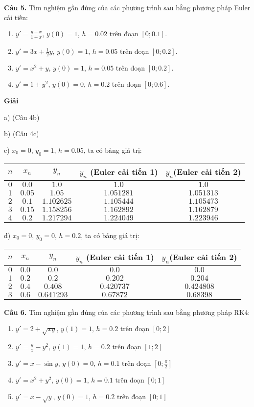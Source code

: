 \textbf{Câu 5.} Tìm nghiệm gần đúng của các phương trình sau bằng phương pháp Euler cải tiến:
\begin{enumerate}[label=\alph*)]
	\item $y'=\frac{y-x}{1+x}$, $y(0)=1$, $h=0.02$ trên đoạn $[0;0.1]$.
	\item $y'=3x+\frac12y$, $y(0)=1$, $h=0.05$ trên đoạn $[0;0.2]$.
	\item $y'=x^2+y$, $y(0)=1$, $h=0.05$ trên đoạn $[0;0.2]$.
	\item $y'=1+y^2$, $y(0)=0$, $h=0.2$ trên đoạn $[0;0.6]$.
\end{enumerate}

\textbf{Giải}\par
a) (Câu 4b)\par
b) (Câu 4c)\par
c) $x_0=0$, $y_0=1$, $h=0.05$, ta có bảng giá trị:
\begin{longtable}{|c|c|c|c|c|}\hline
	$n$ & $x_n$ & $y_n$ & $y_n$ (Euler cải tiến 1) & $y_n$(Euler cải tiến 2) \\ \hline
	$0$ & $0.0$ & $1.0$ & $1.0$ & $1.0$ \\ \hline
	$1$ & $0.05$ & $1.05$ & $1.051281$ & $1.051313$ \\ \hline
	$2$ & $0.1$ & $1.102625$ & $1.105444$ & $1.105473$ \\ \hline
	$3$ & $0.15$ & $1.158256$ & $1.162892$ & $1.162879$ \\ \hline
	$4$ & $0.2$ & $1.217294$ & $1.224049$ & $1.223946$ \\ \hline
\end{longtable}

d) $x_0=0$, $y_0=0$, $h=0.2$, ta có bảng giá trị:
\begin{longtable}{|c|c|c|c|c|}\hline
$n$ & $x_n$ & $y_n$ & $y_n$ (Euler cải tiến 1) & $y_n$(Euler cải tiến 2) \\ \hline
	$0$ & $0.0$ & $0.0$ & $0.0$ & $0.0$ \\ \hline
	$1$ & $0.2$ & $0.2$ & $0.202$ & $0.204$ \\ \hline
	$2$ & $0.4$ & $0.408$ & $0.420737$ & $0.424808$ \\ \hline
	$3$ & $0.6$ & $0.641293$ & $0.67872$ & $0.68398$ \\ \hline
\end{longtable}

\textbf{Câu 6.} Tìm nghiệm gần đúng của các phương trình sau bằng phương pháp RK4:
\begin{enumerate}[label=\alph*)]
	\item $y'=2+\sqrt{xy}$, $y(1)=1$, $h=0.2$ trên đoạn $[0;2]$
	\item $y'=\frac{y}{x}-y^2$, $y(1)=1$, $h=0.2$ trên đoạn $[1;2]$
	\item $y'=x-\sin y$, $y(0)=0$, $h=0.1$ trên đoạn $\left[0;\frac{\pi}{2}\right]$
	\item $y'=x^2+y^2$, $y(0)=1$, $h=0.1$ trên đoạn $[0;1]$
	\item $y'=x-\sqrt{y}$, $y(0)=1$, $h=0.2$ trên đoạn $[0;1]$
\end{enumerate}

